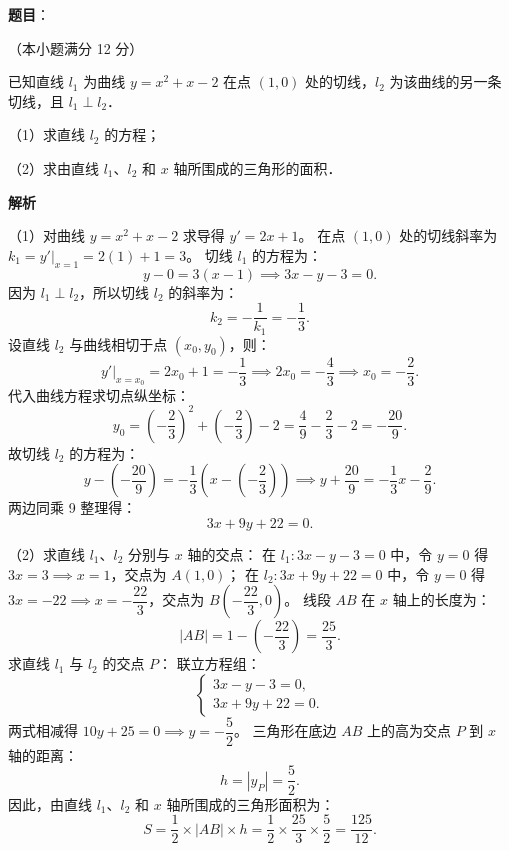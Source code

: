 \begin{answer}

\textbf{题目}：

（本小题满分 12 分）

已知直线 $l_1$ 为曲线 $y=x^2+x-2$ 在点 $(1,0)$ 处的切线，$l_2$ 为该曲线的另一条切线，且 $l_1\perp l_2$．

（1）求直线 $l_2$ 的方程；

（2）求由直线 $l_1$、$l_2$ 和 $x$ 轴所围成的三角形的面积．

\textbf{解析}

（1）对曲线 $y=x^2+x-2$ 求导得 $y'=2x+1$。
在点 $(1,0)$ 处的切线斜率为 $k_1=y'\big|_{x=1}=2(1)+1=3$。
切线 $l_1$ 的方程为：
\nopagebreak[4]
\[
y-0=3(x-1)\implies 3x-y-3=0.
\]
因为 $l_1\perp l_2$，所以切线 $l_2$ 的斜率为：
\nopagebreak[4]
\[
k_2=-\frac{1}{k_1}=-\frac{1}{3}.
\]
设直线 $l_2$ 与曲线相切于点 $(x_0,y_0)$，则：
\nopagebreak[4]
\[
y'\big|_{x=x_0}=2x_0+1=-\frac{1}{3}\implies 2x_0=-\frac{4}{3}\implies x_0=-\frac{2}{3}.
\]
代入曲线方程求切点纵坐标：
\nopagebreak[4]
\[
y_0=\left(-\frac{2}{3}\right)^2+\left(-\frac{2}{3}\right)-2=\frac{4}{9}-\frac{2}{3}-2=-\frac{20}{9}.
\]
故切线 $l_2$ 的方程为：
\nopagebreak[4]
\[
y-\left(-\frac{20}{9}\right)=-\frac{1}{3}\left(x-\left(-\frac{2}{3}\right)\right)\implies y+\frac{20}{9}=-\frac{1}{3}x-\frac{2}{9}.
\]
两边同乘 9 整理得：
\nopagebreak[4]
\[
3x+9y+22=0.
\]

（2）求直线 $l_1$、$l_2$ 分别与 $x$ 轴的交点：
在 $l_1: 3x-y-3=0$ 中，令 $y=0$ 得 $3x=3\implies x=1$，交点为 $A(1,0)$；
在 $l_2: 3x+9y+22=0$ 中，令 $y=0$ 得 $3x=-22\implies x=-\dfrac{22}{3}$，交点为 $B\left(-\dfrac{22}{3},0\right)$。
线段 $AB$ 在 $x$ 轴上的长度为：
\nopagebreak[4]
\[
|AB|=1-\left(-\frac{22}{3}\right)=\frac{25}{3}.
\]
求直线 $l_1$ 与 $l_2$ 的交点 $P$：
联立方程组：
\nopagebreak[4]
\[
\begin{cases}
3x-y-3=0,\\
3x+9y+22=0.
\end{cases}
\]
两式相减得 $10y+25=0\implies y=-\dfrac{5}{2}$。
三角形在底边 $AB$ 上的高为交点 $P$ 到 $x$ 轴的距离：
\nopagebreak[4]
\[
h=|y_P|=\frac{5}{2}.
\]
因此，由直线 $l_1$、$l_2$ 和 $x$ 轴所围成的三角形面积为：
\nopagebreak[4]
\[
S=\frac{1}{2}\times |AB|\times h=\frac{1}{2}\times\frac{25}{3}\times\frac{5}{2}=\frac{125}{12}.
\]


\end{answer}
